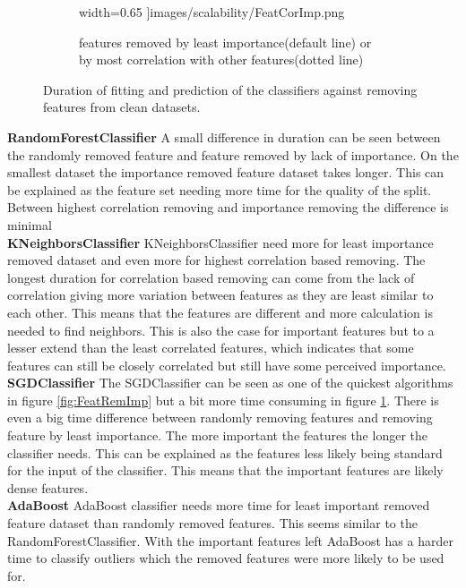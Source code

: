 \documentclass[a4paper,10pt]{article}
\begin{document}
\begin{figure}[H]
\begin{subfigure}[b]{0.45\textwidth}
		width=0.65\textwidth
		]{images/scalability/FeatCorImp.png}
		\caption{features removed by least importance(default line) or by most correlation with other features(dotted line)}
		\label{fig:FeatCorImp}
	\end{subfigure}
	
	\caption{Duration of fitting and prediction of the classifiers against removing features from clean datasets.}
	\label{fig:FeatRem}
\end{figure}

\textbf{RandomForestClassifier} A small difference in duration can be seen between the randomly removed feature and feature removed by lack of importance. On the smallest dataset the importance removed feature dataset takes longer. This can be explained as the feature set needing more time for the quality of the split. Between highest correlation removing and importance removing the difference is minimal\\

\textbf{KNeighborsClassifier} KNeighborsClassifier need more for least importance removed dataset and even more for highest correlation based removing. The longest duration for correlation based removing can come from the lack of correlation giving more variation between features as they are least similar to each other. This means that the features are different and more calculation is needed to find neighbors. This is also the case for important features but to a lesser extend than the least correlated features, which indicates that some features can still be closely correlated but still have some perceived importance.\\

\textbf{SGDClassifier} The SGDClassifier can be seen as one of the quickest algorithms in figure \ref{fig:FeatRemImp} but a bit more time consuming in figure \ref{fig:FeatCorImp}. There is even a big time difference between randomly removing features and removing feature by least importance. The more important the features the longer the classifier needs. This can be explained as the features less likely being standard for the input of the classifier. This means that the important features are likely dense features. \\

\textbf{AdaBoost} AdaBoost classifier needs more time for least important removed feature dataset than randomly removed features. This seems similar to the RandomForestClassifier. With the important features left AdaBoost has a harder time to classify outliers which the removed features were more likely to be used for. \\
\end{document}
